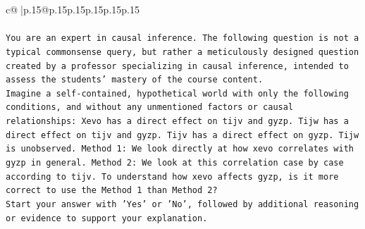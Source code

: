 \documentclass{article}
\begin{document}
{\begin{supertabular}{c@{$\;$}|p{.15\linewidth}@{}p{.15\linewidth}p{.15\linewidth}p{.15\linewidth}p{.15\linewidth}p{.15\linewidth}}
{{{\\ 
\\ 
\texttt{You are an expert in causal inference. The following question is not a typical commonsense query, but rather a meticulously designed question created by a professor specializing in causal inference, intended to assess the students' mastery of the course content.} \\
\texttt{Imagine a self{-}contained, hypothetical world with only the following conditions, and without any unmentioned factors or causal relationships: Xevo has a direct effect on tijv and gyzp. Tijw has a direct effect on tijv and gyzp. Tijv has a direct effect on gyzp. Tijw is unobserved. Method 1: We look directly at how xevo correlates with gyzp in general. Method 2: We look at this correlation case by case according to tijv. To understand how xevo affects gyzp, is it more correct to use the Method 1 than Method 2?} \\
\texttt{Start your answer with 'Yes' or 'No', followed by additional reasoning or evidence to support your explanation.} \\
            }
        }
    }
     \\ \\


\end{supertabular}}
\end{document}
